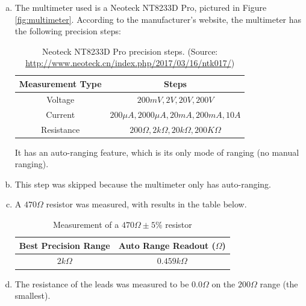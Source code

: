 \documentclass[12pt]{article}
\begin{document}
\begin{enumerate}[a)]
    \item The multimeter used is a Neoteck NT8233D Pro, pictured in Figure \ref{fig:multimeter}. 
        According to the manufacturer's website, the multimeter has the following precision steps: 
        \begin{table}[H]
            \label{tbl:mmsteps}
            \centering
            \caption{Neoteck NT8233D Pro precision steps. (Source: \url{http://www.neoteck.cn/index.php/2017/03/16/ntk017/})}
            \begin{tabular}{c c}
                \hline
                Measurement Type & Steps \\
                \hline
                Voltage & $200mV, 2V, 20V, 200V$ \\ 
                Current & $200\mu A, 2000\mu A, 20mA, 200mA, 10A$ \\
                Resistance & $200\Omega,2k\Omega,20k\Omega,200K\Omega$ \\
                \hline 
            \end{tabular}
            
        \end{table}
        It has an auto-ranging feature, which is its only mode 
        of ranging (no manual ranging). 
    
    \item This step was skipped because the multimeter only has auto-ranging.
    \item A $470\Omega$ resistor was measured, with results in the table below.
        \begin{table}[ht]
            \label{tbl:470res}
            \caption{Measurement of a $470\Omega\pm 5\%$ resistor}
            \centering
            \begin{tabular}{| c | c |}
                \hline
                Best Precision Range & Auto Range Readout ($\Omega$) \\
                \hline
                $2k\Omega$ & $0.459 k\Omega$  \\
                \hline
            \end{tabular} 
        \end{table}
    
    \item The resistance of the leads was measured to be $0.0\Omega$ on the $200\Omega$ range (the smallest).
\end{enumerate}
    
\end{document}
